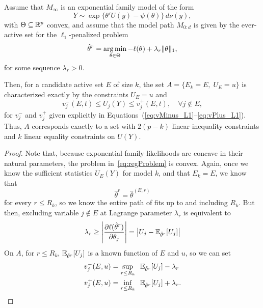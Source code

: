 \documentclass{article}
\begin{document}
\begin{theorem}
  Assume that $M_\infty$ is an exponential family model
  of the form
  \[
  Y \sim \exp\{ \theta'U(y) - \psi(\theta) \}\,d\nu(y),
  \]
  with $\Theta \subseteq \mathbb{R}^p$ convex, and assume
  that the model path $M_{0:d}$ is given 
  by the ever-active set for the $\ell_1$-penalized problem
  \begin{equation}\label{eq:regProblem}
  \hat\theta^r = \operatorname*{arg\,min}_{\theta\in \Theta} 
  -\ell(\theta) + \lambda_r\|\theta\|_1,
  \end{equation}
  for some sequence $\lambda_r > 0$.

  Then, for a candidate active set $E$ of size $k$, 
  the set $A = \{E_k = E, \;U_E = u\}$ is characterized 
  exactly by the constraints $U_E = u$ and
  \[
  v_j^-(E,t) \leq U_j(Y) \leq v_j^+(E,t), \quad\forall j \notin E,
  \]
  for $v_j^-$ and $v_j^+$ given explicitly in
  Equations~(\ref{eq:vMinus_L1}--\ref{eq:vPlus_L1}).
  Thus, $A$ corresponds exactly to 
  a set with $2(p-k)$ linear inequality constraints and $k$
  linear equality constraints on $U(Y)$.
\end{theorem}


\begin{proof}
  Note that, because exponential family likelihoods are concave in their natural parameters, the problem in~\eqref{eq:regProblem} is convex. Again, once we know the sufficient statistics $U_E(Y)$ for model $k$, and that $E_k=E$, we know that
  \[
  \hat\theta^r = \hat\theta^{(E,r)}
  \]
  for every $r \leq R_k$, so we know the entire path of fits up to and including $R_k$. But then, excluding variable $j \notin E$ at Lagrange parameter $\lambda_r$ is equivalent to
  \[
  \lambda_r \geq 
  \left| \frac{\partial \ell(\hat\theta^r)}{\partial \theta_j} \right|
  = \left|U_j - \mathbb{E}_{\hat\theta^r}[U_j]\right|
  \]
  On $A$, for $r \leq R_k$, 
  $\mathbb{E}_{\hat\theta^r}[U_j]$ is a known function of $E$ and $u$,
  so we can set
  \begin{align}\label{eq:vMinus_L1}
    v_j^-(E,u) &= \sup_{r \leq R_k} \;\; 
    \mathbb{E}_{\hat\theta^r}[U_j] - \lambda_r \\
    \label{eq:vPlus_L1}
    v_j^+(E,u) &= \inf_{r \leq R_k} \;\;
    \mathbb{E}_{\hat\theta^r}[U_j] + \lambda_r .
  \end{align}
\end{proof}
\end{document}
